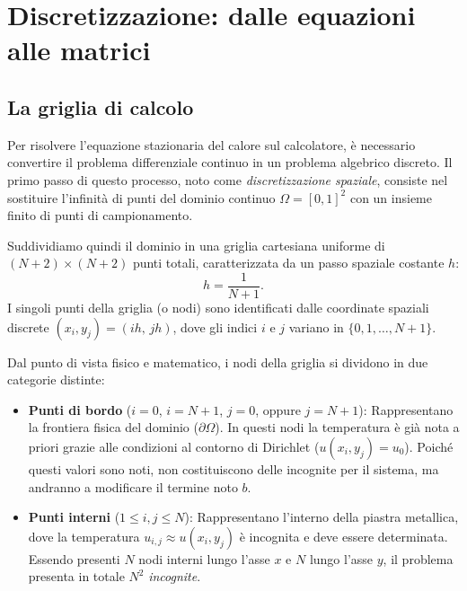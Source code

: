\documentclass[a4paper,11pt]{article}
\theoremstyle{definition}
\begin{document}
\section{Discretizzazione: dalle equazioni alle matrici}

\subsection{La griglia di calcolo}

Per risolvere l'equazione stazionaria del calore sul calcolatore, è necessario convertire il problema differenziale continuo in un problema algebrico discreto. Il primo passo di questo processo, noto come \emph{discretizzazione spaziale}, consiste nel sostituire l'infinità di punti del dominio continuo $\Omega = [0,1]^2$ con un insieme finito di punti di campionamento.

Suddividiamo quindi il dominio in una griglia cartesiana uniforme di $(N+2)\times(N+2)$ punti totali, caratterizzata da un passo spaziale costante $h$:
\[
  h = \frac{1}{N+1}.
\]
I singoli punti della griglia (o nodi) sono identificati dalle coordinate spaziali discrete $(x_i, y_j) = (ih,\, jh)$, dove gli indici $i$ e $j$ variano in $\{0, 1, \ldots, N+1\}$. 

Dal punto di vista fisico e matematico, i nodi della griglia si dividono in due categorie distinte:
\begin{itemize}
  \item \textbf{Punti di bordo} ($i=0$, $i=N+1$, $j=0$, oppure $j=N+1$): 
        Rappresentano la frontiera fisica del dominio ($\partial\Omega$). In questi nodi la temperatura è già nota a priori grazie alle condizioni al contorno di Dirichlet ($u(x_i, y_j) = u_0$). Poiché questi valori sono noti, non costituiscono delle incognite per il sistema, ma andranno a modificare il termine noto $b$.
  \item \textbf{Punti interni} ($1 \le i,j \le N$): 
        Rappresentano l'interno della piastra metallica, dove la temperatura $u_{i,j} \approx u(x_i, y_j)$ è incognita e deve essere determinata. Essendo presenti $N$ nodi interni lungo l'asse $x$ e $N$ lungo l'asse $y$, il problema presenta in totale $N^2$ \emph{incognite}.
\end{itemize}
\end{document}
